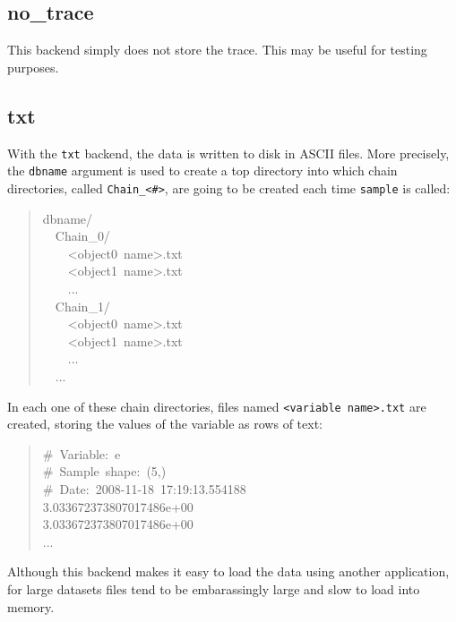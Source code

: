 
\hypertarget{no-trace}{}
\subsection{no{\_}trace}
\label{no-trace}

This backend simply does not store the trace. This may be useful for testing
purposes.



\hypertarget{txt}{}
\subsection{txt}
\label{txt}

With the \texttt{txt} backend, the data is written to disk in ASCII files.
More precisely, the \texttt{dbname} argument is used to create a top directory
into which chain directories, called \texttt{Chain{\_}<{\#}>}, are going to be created each
time \texttt{sample} is called:
\begin{quote}{\ttfamily \raggedright \noindent
dbname/~\\
~~Chain{\_}0/~\\
~~~~<object0~name>.txt~\\
~~~~<object1~name>.txt~\\
~~~~...~\\
~~Chain{\_}1/~\\
~~~~<object0~name>.txt~\\
~~~~<object1~name>.txt~\\
~~~~...~\\
~~...
}\end{quote}

In each one of these chain directories, files named \texttt{<variable name>.txt}
are created, storing the values of the variable as rows of text:
\begin{quote}{\ttfamily \raggedright \noindent
{\#}~Variable:~e~\\
{\#}~Sample~shape:~(5,)~\\
{\#}~Date:~2008-11-18~17:19:13.554188~\\
3.033672373807017486e+00~\\
3.033672373807017486e+00~\\
...
}\end{quote}

Although this backend makes it easy to load the data using another application,
for large datasets files tend to be embarassingly large and slow to load
into memory.


